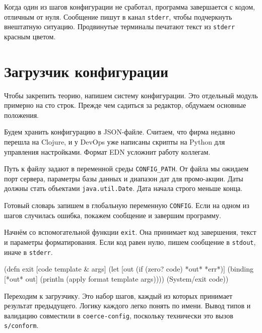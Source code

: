 
Когда один из шагов конфигурации не сработал, программа завершается с кодом,
отличным от нуля. Сообщение пишут в канал \verb|stderr|, чтобы подчеркнуть
внештатную ситуацию. Продвинутые терминалы печатают текст из \verb|stderr|
красным цветом.

\section{Загрузчик конфигурации}


Чтобы закрепить теорию, напишем систему конфигурации. Это отдельный модуль
примерно на сто строк. Прежде чем садиться за редактор, обдумаем основные
положения.

Будем хранить конфигурацию в JSON-файле. Считаем, что фирма недавно перешла на
Clojure, и у DevOps уже написаны скрипты на Python для управления
настройками. Формат EDN усложнит работу коллегам.


Путь к файлу задают в переменной среды \verb|CONFIG_PATH|. От файла мы ожидаем
порт сервера, параметры базы данных и диапазон дат для промо-акции. Даты должны
стать объектами \verb|java.util.Date|. Дата начала строго меньше конца.

Готовый словарь запишем в глобальную переменную \verb|CONFIG|. Если на одном
из шагов случилась ошибка, покажем сообщение и завершим программу.

Начнём со вспомогательной функции \verb|exit|. Она принимает код завершения,
текст и параметры форматирования. Если код равен нулю, пишем сообщение в
\verb|stdout|, иначе в \verb|stderr|.


\begin{english}
  \begin{clojure}
(defn exit
  [code template & args]
  (let [out (if (zero? code) *out* *err*)]
    (binding [*out* out]
      (println (apply format template args))))
  (System/exit code))
  \end{clojure}
\end{english}

Переходим к загрузчику. Это набор шагов, каждый из которых принимает результат
предыдущего. Логику каждого легко понять по имени. Вывод типов и валидацию
совместили в \verb|coerce-config|, поскольку технически это вызов
\verb|s/conform|.

